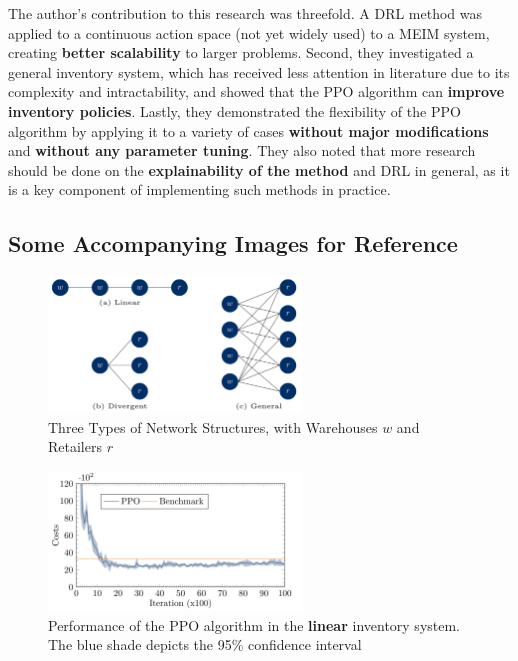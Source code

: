 \documentclass[12pt]{article}
\begin{document}
\noindent The author's contribution to this research was threefold. A DRL method was applied to a continuous action space (not yet widely used) to a MEIM system, creating \textbf{better scalability} to larger problems. Second, they investigated a general inventory system, which has received less attention in literature due to its complexity and intractability, and showed that the PPO algorithm can \textbf{improve inventory policies}. Lastly, they demonstrated the flexibility of the PPO algorithm by applying it to a variety of cases \textbf{without major modifications} and \textbf{without any parameter tuning}. They also noted that more research should be done on the \textbf{explainability of the method} and DRL in general, as it is a key component of implementing such methods in practice. 

\newpage

\subsection*{Some Accompanying Images for Reference}

\begin{figure}[H]
    \centering
    \includegraphics[width=0.6\textwidth]{Images/threenetworks.png}
    \caption{Three Types of Network Structures, with Warehouses $w$ and Retailers $r$}
    \label{fig:5-threenetwork}
\end{figure} 

\begin{figure}[H]
    \centering
    \includegraphics[width=0.6\textwidth]{Images/linearnetwork.png}
    \caption{Performance of the PPO algorithm in the \textbf{linear} inventory system. The blue shade depicts the 95\% confidence interval}
    \label{fig:5-linearnetwork}
\end{figure} 
\end{document}
